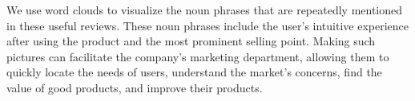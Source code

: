 \documentclass{mcmthesis}
\begin{document}
    We use word clouds to visualize the noun phrases that are repeatedly mentioned in these useful reviews. These noun phrases include the user's intuitive experience after using the product and the most prominent selling point. Making such pictures can facilitate the company's marketing department, allowing them to quickly locate the needs of users, understand the market's concerns, find the value of good products, and improve their products.
    
\end{document}
